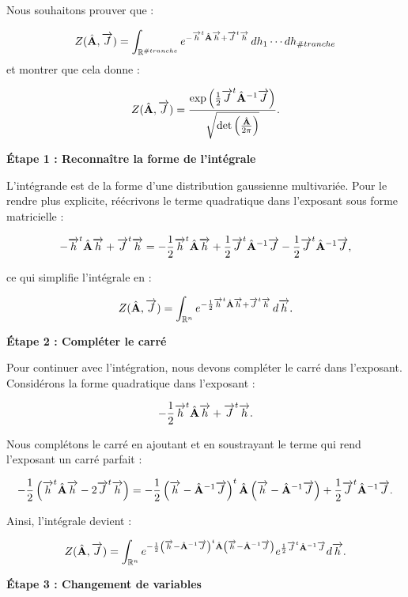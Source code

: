 {\color{magenta}


Nous souhaitons prouver que :

\[
Z(\hat{\mathbf{A}} , \mathbf{\overrightarrow{J}}) = \int_{\mathbb{R}^{\#tranche}} e^{-\mathbf{\overrightarrow{h}}^t \hat{\mathbf{A}} \mathbf{\overrightarrow{h}} + \mathbf{\overrightarrow{J}}^t \mathbf{\overrightarrow{h}}} \, dh_1 \cdots dh_{\#tranche}
\]
et montrer que cela donne :

\[
Z(\hat{\mathbf{A}} , \mathbf{\overrightarrow{J}}) = \frac{\exp\left( \frac{1}{2} \mathbf{\overrightarrow{J}}^t \hat{\mathbf{A}}^{-1} \mathbf{\overrightarrow{J}} \right)}{\sqrt{\det \left( \frac{\hat{\mathbf{A}}}{2\pi} \right)}}.
\]

\textbf{Étape 1 : Reconnaître la forme de l'intégrale}

L'intégrande est de la forme d'une distribution gaussienne multivariée. Pour le rendre plus explicite, réécrivons le terme quadratique dans l'exposant sous forme matricielle :

\[
-\mathbf{\overrightarrow{h}}^t \hat{\mathbf{A}} \mathbf{\overrightarrow{h}} + \mathbf{\overrightarrow{J}}^t \mathbf{\overrightarrow{h}} = -\frac{1}{2} \mathbf{\overrightarrow{h}}^t \hat{\mathbf{A}} \mathbf{\overrightarrow{h}} + \frac{1}{2} \mathbf{\overrightarrow{J}}^t \hat{\mathbf{A}}^{-1} \mathbf{\overrightarrow{J}} - \frac{1}{2} \mathbf{\overrightarrow{J}}^t \hat{\mathbf{A}}^{-1} \mathbf{\overrightarrow{J}},
\]

ce qui simplifie l'intégrale en :

\[
Z(\hat{\mathbf{A}}, \mathbf{\overrightarrow{J}}) = \int_{\mathbb{R}^n} e^{-\frac{1}{2} \mathbf{\overrightarrow{h}}^t \hat{\mathbf{A}} \mathbf{\overrightarrow{h}} + \mathbf{\overrightarrow{J}}^t \mathbf{\overrightarrow{h}}} \, d\mathbf{\overrightarrow{h}}.
\]

\textbf{Étape 2 : Compléter le carré}

Pour continuer avec l'intégration, nous devons compléter le carré dans l'exposant. Considérons la forme quadratique dans l'exposant :

\[
-\frac{1}{2} \mathbf{\overrightarrow{h}}^t \hat{\mathbf{A}} \mathbf{\overrightarrow{h}} + \mathbf{\overrightarrow{J}}^t \mathbf{\overrightarrow{h}}.
\]

Nous complétons le carré en ajoutant et en soustrayant le terme qui rend l'exposant un carré parfait :

\[
-\frac{1}{2} \left( \mathbf{\overrightarrow{h}}^t \hat{\mathbf{A}} \mathbf{\overrightarrow{h}} - 2 \mathbf{\overrightarrow{J}}^t \mathbf{\overrightarrow{h}} \right) = -\frac{1}{2} \left( \mathbf{\overrightarrow{h}} - \hat{\mathbf{A}}^{-1} \mathbf{\overrightarrow{J}} \right)^t \hat{\mathbf{A}} \left( \mathbf{\overrightarrow{h}} - \hat{\mathbf{A}}^{-1} \mathbf{\overrightarrow{J}} \right) + \frac{1}{2} \mathbf{\overrightarrow{J}}^t \hat{\mathbf{A}}^{-1} \mathbf{\overrightarrow{J}}.
\]

Ainsi, l'intégrale devient :

\[
Z(\hat{\mathbf{A}}, \mathbf{\overrightarrow{J}}) = \int_{\mathbb{R}^n} e^{-\frac{1}{2} \left( \mathbf{\overrightarrow{h}} - \hat{\mathbf{A}}^{-1} \mathbf{\overrightarrow{J}} \right)^t \hat{\mathbf{A}} \left( \mathbf{\overrightarrow{h}} - \hat{\mathbf{A}}^{-1} \mathbf{\overrightarrow{J}} \right)} e^{\frac{1}{2} \mathbf{\overrightarrow{J}}^t \hat{\mathbf{A}}^{-1} \mathbf{\overrightarrow{J}}} d\mathbf{\overrightarrow{h}}.
\]

\textbf{Étape 3 : Changement de variables}

}
